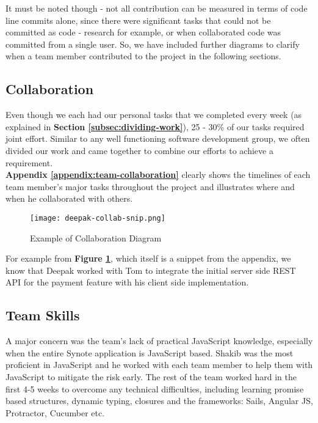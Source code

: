 It must be noted though - not all contribution can be measured in terms of code line commits alone, since there were significant tasks that could not be committed as code - research for example, or when collaborated code was committed from a single user. So, we have included further diagrams to clarify when a team member contributed to the project in the following sections.

\subsection{Collaboration}
\label{subsec:collaboration}

Even though we each had our personal tasks that we completed every week (as explained in \textbf{Section \ref{subsec:dividing-work}}), 25 - 30\% of our tasks  required joint effort. Similar to any well functioning software development group, we often divided our work and came together to combine our efforts to achieve a requirement.\\

\textbf{Appendix \ref{appendix:team-collaboration}} clearly shows the timelines of each team member's major tasks throughout the project and illustrates where and when he collaborated with others.\\

\begin{figure}[!hbt]
  	\centering
 	\texttt{[image: deepak-collab-snip.png]}
  	\caption{Example of Collaboration Diagram}
 	\label{fig:deepak-collaboration-snippet}
\end{figure}

For example from \textbf{Figure \ref{fig:deepak-collaboration-snippet}}, which itself is a snippet from the appendix, we know that Deepak worked with Tom to integrate the initial server side REST API for the payment feature with his client side implementation.

\subsection{Team Skills}
\label{subsec:team-skills}

A major concern was the team's lack of practical JavaScript knowledge, especially when the entire Synote application is JavaScript based. Shakib was the most proficient in JavaScript and he worked with each team member to help them with JavaScript to mitigate the risk early. The rest of the team worked hard in the first 4-5 weeks to overcome any technical difficulties, including learning promise based structures, dynamic typing, closures and the frameworks: Sails, Angular JS, Protractor, Cucumber etc.\\

